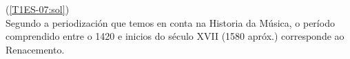 %
%
%
%
    {%
    (\ref{T1ES-07:sol}) {\color{orange}{\hrulefill}}
    \\ \small{%
    Segundo a periodización que temos en conta na Historia da Música, o período comprendido entre o 1420 e inicios do século XVII (1580 apróx.) corresponde ao Renacemento.
    {\color{orange}{\hrulefill}}
    }
    }
